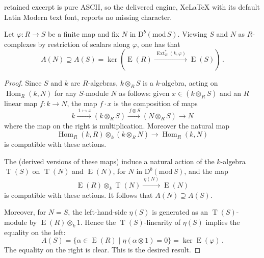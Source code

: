 \documentclass[10pt,a4paper]{amsart}
\newcommand{\Hom}{\operatorname{Hom}}
\newcommand{\dbcat}[1]{\mathrm{D}^b(\mathrm{mod}\,{#1})}
\newcommand{\eee}{\operatorname{E}}
\newcommand{\ext}{\operatorname{Ext}}
\newcommand{\tee}{\operatorname{T}}
\begin{document}
retained excerpt is pure ASCII, so the delivered engine, XeLaTeX with its default Latin Modern text font, reports no missing character.
\begin{proposition}
    \label{pr:A-change-of-rings}
Let $\varphi\colon R\to S$ be a finite map and fix $N$ in $\dbcat S$. Viewing $S$ and $N$ as $R$-complexes by restriction of scalars along $\varphi$, one has that
\[
A(N)\supseteq A(S) = \ker(\eee(R)\xrightarrow{\ \ext_R^*(k,\varphi)\ } \eee(S))\,.
\]
\end{proposition}

\begin{proof}
Since $S$ and $k$ are $R$-algebras, $k\otimes_RS$ is a $k$-algebra, acting on $\Hom_R(k,N)$ for any $S$-module $N$ as follows: given $x\in (k\otimes_RS)$ and an $R$ linear map $f\colon k\to N$, the map $f\cdot x$ is the composition of maps
\[
k\xrightarrow{\ 1\mapsto x} (k\otimes_RS)\xrightarrow{\ f\otimes S} (N\otimes_RS) \longrightarrow N
\]
where the map on the right is multiplication. Moreover the natural map
\[
\Hom_R(k,R)\otimes_k (k\otimes_RN) \longrightarrow \Hom_R(k,N)
\]
is compatible with these actions. 

The (derived versions of these maps) induce a natural action of the $k$-algebra $\tee(S)$ on $\tee(N)$ and $\eee(N)$, for  $N$ in $\dbcat S$,  and the map
 \[
 \eee(R)\otimes_k\tee(N) \xrightarrow{\ \eta(N)\ } \eee(N)
 \]
is compatible with these actions. It follows that $A(N)\supseteq A(S)$. 

Moreover, for $N=S$, the left-hand-side $\eta(S)$ is generated as an $\tee(S)$-module by $\eee(R)\otimes_k 1$. Hence the $\tee(S)$-linearity of $\eta(S)$ implies the equality on the left:
\[
A(S)=\{\alpha\in \eee(R)\mid \eta(\alpha\otimes 1)=0\}=\ker \eee(\varphi)\,.
\]
The equality on the right is clear. This  is the desired result.
 \end{proof}
\end{document}
